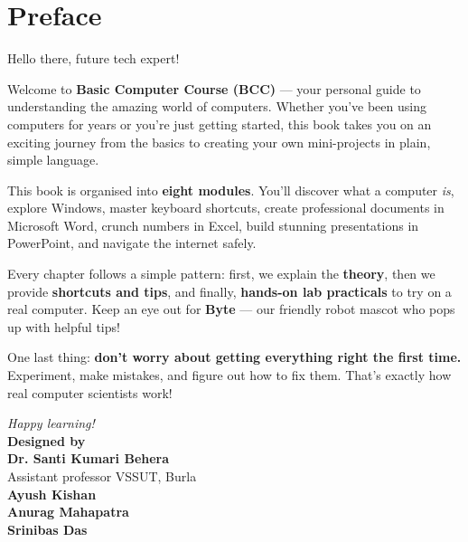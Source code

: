
\chapter*{Preface}

\begin{center}
\end{center}

\vspace{8pt}

Hello there, future tech expert! \faRocket

Welcome to \textbf{Basic Computer Course (BCC)} --- your personal guide to understanding the amazing world of computers. Whether you've been using computers for years or you're just getting started, this book takes you on an exciting journey from the basics to creating your own mini-projects in plain, simple language.

This book is organised into \textbf{eight modules}. You'll discover what a computer \emph{is}, explore Windows, master keyboard shortcuts, create professional documents in Microsoft Word, crunch numbers in Excel, build stunning presentations in PowerPoint, and navigate the internet safely. 

Every chapter follows a simple pattern: first, we explain the \textbf{theory}, then we provide \textbf{shortcuts and tips}, and finally, \textbf{hands-on lab practicals} to try on a real computer. Keep an eye out for \textbf{Byte} --- our friendly robot mascot who pops up with helpful tips!

One last thing: \textbf{don't worry about getting everything right the first time.} Experiment, make mistakes, and figure out how to fix them. That's exactly how real computer scientists work!

\vspace{8pt}

\begin{flushright}
\textit{Happy learning!}\\[4pt]
\textbf{Designed by}\\[2pt]
\textbf{Dr. Santi Kumari Behera}\\[1pt]
Assistant professor VSSUT, Burla\\[2pt]
\textbf{Ayush Kishan}\\[1pt]
\textbf{Anurag Mahapatra}\\[1pt]
\textbf{Srinibas Das}
\end{flushright}

\vspace{-4pt}
